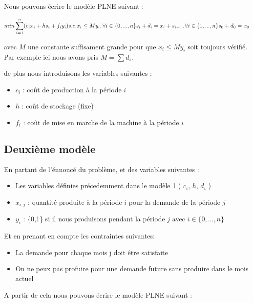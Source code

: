 \documentclass[10pt]{article}
\begin{document}
Nous pouvons écrire le modèle PLNE suivant :

$$
    min \sum_{i=1}^{n} (c_{i}x_{i} + hs_{i} + f_iy_{i}) \\
    s.c. \space\space x_i \leq M y_i, \space\space \forall i \in \{0,...,n\} \\
    s_i + d_i = x_i + s_{i-1}, \space\space \forall i \in \{1,...,n\} \\
    s_0 + d_0 = x_0 \\
  $$

avec $M$ une constante suffisament grande pour que $x_i \leq M y_i$ soit toujours vérifié. Par exemple ici nous avons pris $M = \sum{d_i}$.

de plus nous introduisons les variables suivantes :

\begin{itemize}
  \item $c_{i}$ : coût de production à la période $i$
  \item $h$ : coût de stockage (fixe)
  \item $f_{i}$ : coût de mise en marche de la machine à la période $i$
\end{itemize}

\subsection*{Deuxième modèle}
En partant de l'énnoncé du problème, et des variables suivantes :

\begin{itemize}
  \item Les variables définies précedemment dans le modèle 1 ( $c_{i}$, $h$, $d_{i}$ )
  \item $x_{i,j}$ : quantité produite à la période $i$ pour la demande de la période $j$
  \item $y_{i}$ : \{0,1\} si il nous produisons pendant la période $j$
avec $i \in \{0,..., n\}$
\end{itemize}

Et en prenant en compte les contraintes suivantes:

\begin{itemize}
  \item La demande pour chaque mois j doit être satisfaite
  \item On ne peux pas profuire pour une demande future sans produire dans le mois actuel
\end{itemize}

A partir de cela nous pouvons écrire le modèle PLNE suivant :
\end{document}
